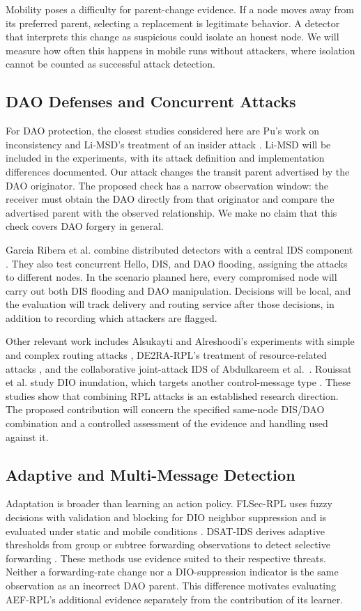 \documentclass[journal]{IEEEtran}
\begin{document}
Mobility poses a difficulty for parent-change evidence. If a node moves away from its preferred parent, selecting a replacement is legitimate behavior. A detector that interprets this change as suspicious could isolate an honest node. We will measure how often this happens in mobile runs without attackers, where isolation cannot be counted as successful attack detection.

\subsection{DAO Defenses and Concurrent Attacks}
For DAO protection, the closest studies considered here are Pu's work on inconsistency \cite{pu2018} and Li-MSD's treatment of an insider attack \cite{limsd2024}. Li-MSD will be included in the experiments, with its attack definition and implementation differences documented. Our attack changes the transit parent advertised by the DAO originator. The proposed check has a narrow observation window: the receiver must obtain the DAO directly from that originator and compare the advertised parent with the observed relationship. We make no claim that this check covers DAO forgery in general.

Garcia Ribera et al. combine distributed detectors with a central IDS component \cite{garciaribera2022}. They also test concurrent Hello, DIS, and DAO flooding, assigning the attacks to different nodes. In the scenario planned here, every compromised node will carry out both DIS flooding and DAO manipulation. Decisions will be local, and the evaluation will track delivery and routing service after those decisions, in addition to recording which attackers are flagged.

Other relevant work includes Alsukayti and Alreshoodi's experiments with simple and complex routing attacks \cite{alsukayti2023}, DE2RA-RPL's treatment of resource-related attacks \cite{de2rarpl2024}, and the collaborative joint-attack IDS of Abdulkareem et al.\ \cite{abdulkareem2024}. Rouissat et al. study DIO inundation, which targets another control-message type \cite{rouissat2023}. These studies show that combining RPL attacks is an established research direction. The proposed contribution will concern the specified same-node DIS/DAO combination and a controlled assessment of the evidence and handling used against it.

\subsection{Adaptive and Multi-Message Detection}
Adaptation is broader than learning an action policy. FLSec-RPL uses fuzzy decisions with validation and blocking for DIO neighbor suppression and is evaluated under static and mobile conditions \cite{flsecrpl2024}. DSAT-IDS derives adaptive thresholds from group or subtree forwarding observations to detect selective forwarding \cite{dsatids2024}. These methods use evidence suited to their respective threats. Neither a forwarding-rate change nor a DIO-suppression indicator is the same observation as an incorrect DAO parent. This difference motivates evaluating AEF-RPL's additional evidence separately from the contribution of its learner.
\end{document}
